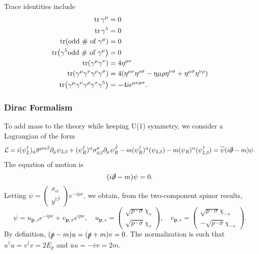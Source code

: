 \documentclass{article}
\begin{document}
Trace identities include 
\begin{align*}
    \tr\gamma^\mu&=0\\
    \tr\gamma^5&=0\\
    \tr(\text{odd \# of }\gamma^\mu)&=0\\
    \tr(\gamma^5\text{odd \# of }\gamma^\mu)&=0\\
    \tr(\gamma^\mu\gamma^\nu)&=4\eta^{\mu\nu}\\
    \tr(\gamma^\mu\gamma^\nu\gamma^\rho\gamma^\sigma)&=4(\eta^{\mu\nu}\eta^{\rho\sigma}-\eta{\mu\rho}\eta^{\nu\sigma}+\eta^{\mu\sigma}\eta^{\nu\rho})\\
    \tr(\gamma^\mu\gamma^\nu\gamma^\rho\gamma^\sigma\gamma^5)&=-4i\epsilon^{\mu\nu\rho\sigma}.
\end{align*}

\subsubsection{Dirac Formalism}

To add mass to the theory while keeping U(1) symmetry, we consider a Lagrangian of the form 
\begin{equation}
    \mathcal L=i(\psi^\dag_L)_{\dot\alpha}\overline\sigma^{\mu\alpha\dot\beta}\partial_\mu\psi_{L\beta}+(\psi^\dag_R)^\alpha\sigma^\mu_{\dot\alpha\beta}\partial_\mu\psi^{\dot\beta}_R-m(\psi^\dag_R)^\alpha(\psi_{L\beta})-m(\psi_R)^\alpha(\psi^\dag_{L\beta})=\overline\psi(i\slashed\partial-m)\psi.
\end{equation}
The equation of motion is 
\begin{equation}
    (i\slashed\partial-m)\psi=0.
\end{equation}
Letting $\psi=\begin{pmatrix}x_\alpha\\y^{\dag\dot\beta}\end{pmatrix}e^{-ipx}$, we obtain, from the two-component spinor results, 
\begin{equation}
    \psi=u_{\mathbf p,s}e^{-ipx}+v_{\mathbf p,x}e^{ipx},\quad u_{\mathbf p,s}=\begin{pmatrix}\sqrt{p\cdot\sigma}\chi_s\\\sqrt{p\cdot\overline\sigma}\chi_s\end{pmatrix},\quad v_{\mathbf p,s}=\begin{pmatrix}\sqrt{p\cdot\sigma}\chi_{-s}\\-\sqrt{p\cdot\overline\sigma}\chi_{-s}\end{pmatrix}.
\end{equation}
By definition, $(\slashed p-m)u=(\slashed p+m)v=0$. The normalization is such that $u^\dag u=v^\dag v=2E_p$ and $\overline uu=-\overline vv=2m$. 
\end{document}
